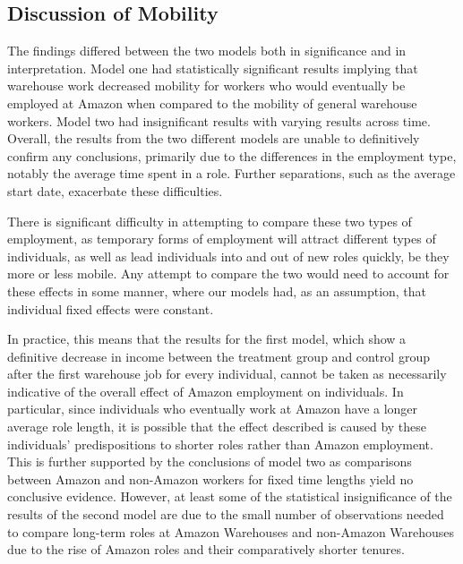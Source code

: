 \documentclass[11pt]{article}
\begin{document}
\subsection{Discussion of Mobility}

\-\hspace{0.5cm} The findings differed between the two models both in significance and in interpretation. Model one had statistically significant results implying that warehouse work decreased mobility for workers who would eventually be employed at Amazon when compared to the mobility of general warehouse workers. Model two had insignificant results with varying results across time. Overall, the results from the two different models are unable to definitively confirm any conclusions, primarily due to the differences in the employment type, notably the average time spent in a role. Further separations, such as the average start date, exacerbate these difficulties.

\-\hspace{0.5cm} There is significant difficulty in attempting to compare these two types of employment, as temporary forms of employment will attract different types of individuals, as well as lead individuals into and out of new roles quickly, be they more or less mobile. Any attempt to compare the two would need to account for these effects in some manner, where our models had, as an assumption, that individual fixed effects were constant.

\-\hspace{0.5cm} In practice, this means that the results for the first model, which show a definitive decrease in income between the treatment group and control group after the first warehouse job for every individual, cannot be taken as necessarily indicative of the overall effect of Amazon employment on individuals. In particular, since individuals who eventually work at Amazon have a longer average role length, it is possible that the effect described is caused by these individuals' predispositions to shorter roles rather than Amazon employment. This is further supported by the conclusions of model two as comparisons between Amazon and non-Amazon workers for fixed time lengths yield no conclusive evidence. However, at least some of the statistical insignificance of the results of the second model are due to the small number of observations needed to compare long-term roles at Amazon Warehouses and non-Amazon Warehouses due to the rise of Amazon roles and their comparatively shorter tenures.
\end{document}
